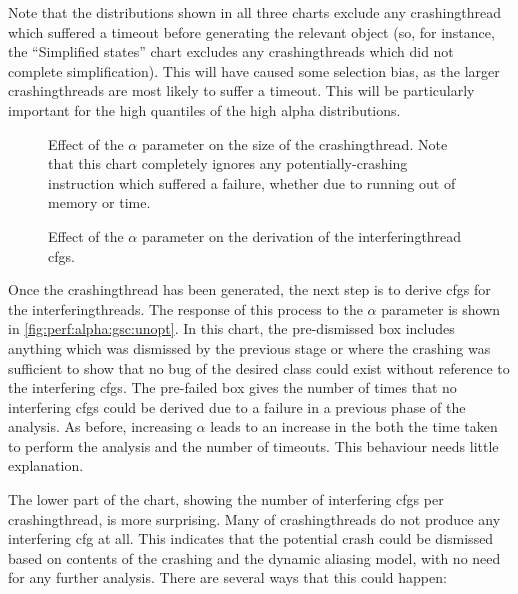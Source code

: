 Note that the distributions shown in all three charts exclude any
\gls{crashingthread} which suffered a timeout before generating the
relevant object (so, for instance, the ``Simplified states'' chart
excludes any \glspl{crashingthread} which did not complete
simplification).  This will have caused some selection bias, as the
larger \glspl{crashingthread} are most likely to suffer a timeout.
This will be particularly important for the high quantiles of the high
\gls{alpha} distributions.

\begin{figure}
  \centerline{}
  \caption{Effect of the $\alpha$ parameter on the size of the
    \gls{crashingthread}.  Note that this chart completely ignores any
    potentially-crashing instruction which suffered a failure, whether
    due to running out of memory or time.}
  \label{fig:eval:time_breakdown:crashing_size}
\end{figure}

\begin{figure}
  
  \caption{Effect of the $\alpha$ parameter on the derivation of the
    \gls{interferingthread} \glspl{cfg}.}
  \label{fig:perf:alpha:gsc:unopt}
\end{figure}

Once the \gls{crashingthread} {\StateMachine} has been generated, the
next step is to derive \glspl{cfg} for the \glspl{interferingthread}.
The response of this process to the $\alpha$ parameter is shown in
\autoref{fig:perf:alpha:gsc:unopt}.  In this chart, the
pre-dismissed box includes anything which was dismissed by the
previous stage or where the crashing {\StateMachine} was sufficient to
show that no bug of the desired class could exist without reference to
the interfering \glspl{cfg}.  The pre-failed box gives the number of
times that no interfering \glspl{cfg} could be derived due to a
failure in a previous phase of the analysis.  As before, increasing
$\alpha$ leads to an increase in the both the time taken to perform
the analysis and the number of timeouts.  This behaviour needs little
explanation.

The lower part of the chart, showing the number of interfering
\glspl{cfg} per \gls{crashingthread}, is more surprising.  Many of
\glspl{crashingthread} do not produce any interfering \gls{cfg} at
all.  This indicates that the potential crash could be dismissed based
on contents of the crashing {\StateMachine} and the dynamic aliasing
model, with no need for any further analysis.  There are several ways
that this could happen:


